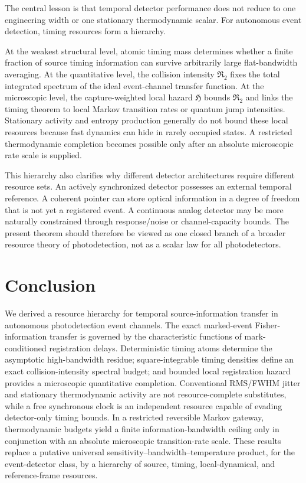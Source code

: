 \documentclass[aps,prapplied,preprint,nofootinbib]{revtex4-2}
\newcommand{\Rtwo}{\mathfrak R_2}
\newcommand{\Hcap}{\mathfrak H}
\begin{document}
The central lesson is that temporal detector performance does not reduce to one engineering width or one stationary thermodynamic scalar.  For autonomous event detection, timing resources form a hierarchy.

At the weakest structural level, atomic timing mass determines whether a finite fraction of source timing information can survive arbitrarily large flat-bandwidth averaging.  At the quantitative level, the collision intensity $\Rtwo$ fixes the total integrated spectrum of the ideal event-channel transfer function.  At the microscopic level, the capture-weighted local hazard $\Hcap$ bounds $\Rtwo$ and links the timing theorem to local Markov transition rates or quantum jump intensities.  Stationary activity and entropy production generally do not bound these local resources because fast dynamics can hide in rarely occupied states.  A restricted thermodynamic completion becomes possible only after an absolute microscopic rate scale is supplied.

This hierarchy also clarifies why different detector architectures require different resource sets.  An actively synchronized detector possesses an external temporal reference.  A coherent pointer can store optical information in a degree of freedom that is not yet a registered event.  A continuous analog detector may be more naturally constrained through response/noise or channel-capacity bounds.  The present theorem should therefore be viewed as one closed branch of a broader resource theory of photodetection, not as a scalar law for all photodetectors.

\section{Conclusion}

We derived a resource hierarchy for temporal source-information transfer in autonomous photodetection event channels.  The exact marked-event Fisher-information transfer is governed by the characteristic functions of mark-conditioned registration delays.  Deterministic timing atoms determine the asymptotic high-bandwidth residue; square-integrable timing densities define an exact collision-intensity spectral budget; and bounded local registration hazard provides a microscopic quantitative completion.  Conventional RMS/FWHM jitter and stationary thermodynamic activity are not resource-complete substitutes, while a free synchronous clock is an independent resource capable of evading detector-only timing bounds.  In a restricted reversible Markov gateway, thermodynamic budgets yield a finite information-bandwidth ceiling only in conjunction with an absolute microscopic transition-rate scale.  These results replace a putative universal sensitivity--bandwidth--temperature product, for the event-detector class, by a hierarchy of source, timing, local-dynamical, and reference-frame resources.


\end{document}
